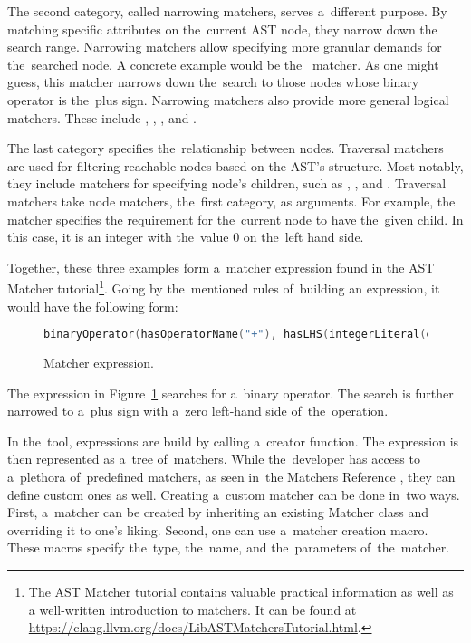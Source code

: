 The second category, called narrowing matchers, serves a~different purpose. 
By matching specific attributes on the~current AST node, they narrow down 
the search range. 
Narrowing matchers allow specifying more granular demands for the~searched 
node. 
A concrete example would be the~ matcher. 
As one might guess, this matcher narrows down the~search to those nodes 
whose binary operator is the~plus sign. 
Narrowing matchers also provide more general logical matchers. 
These include , , , 
and .

The last category specifies the~relationship between nodes. 
Traversal matchers are used for filtering reachable nodes based on 
the AST's structure. 
Most notably, they include matchers for specifying node's children, 
such as , , and . 
Traversal matchers take node matchers, the~first category, as arguments. 
For example, the~ matcher specifies
the requirement for the~current node to have the~given child. 
In this case, it is an integer with the~value 0 on the~left hand side.

Together, these three examples form a~matcher expression found in
the AST Matcher tutorial\footnote{The AST Matcher tutorial contains 
valuable practical information as well as a well-written introduction
to matchers. It can be found at 
\url{https://clang.llvm.org/docs/LibASTMatchersTutorial.html}.}. 
Going by the~mentioned rules of~building an expression, it would have 
the following form: 

\begin{figure}[H]\centering
\begin{lstlisting}[language=C++, numbers=none]
binaryOperator(hasOperatorName("+"), hasLHS(integerLiteral(equals(0)))).
\end{lstlisting}
\caption{Matcher expression.}
\label{lst:matcherexpr}
\end{figure}

The expression in Figure~\ref{lst:matcherexpr} searches for a~binary 
operator. 
The search is further narrowed to a~plus sign with a~zero left-hand 
side of~the~operation.

In the~tool, expressions are build by calling a~creator function. 
The expression is then represented as a~tree of~matchers. 
While the~developer has access to a~plethora of~predefined matchers, 
as seen in~the Matchers Reference \citep{matchersreference:online}, 
they can define custom ones as well. 
Creating a~custom matcher can be done in~two ways. 
First, a~matcher can be created by inheriting an existing Matcher class 
and overriding it to one's liking. 
Second, one can use a~matcher creation macro. 
These macros specify the~type, the~name, and the~parameters of~the~matcher.

